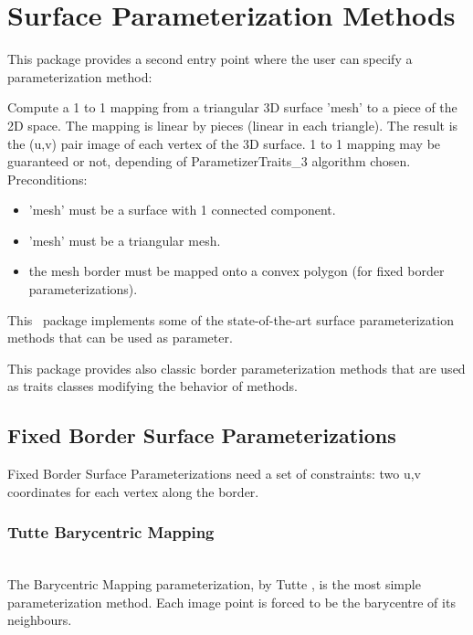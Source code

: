 \section{Surface Parameterization Methods}


This package provides a second  entry point
where the user can specify a parameterization method:

{
Compute a 1 to 1 mapping from a triangular 3D surface 'mesh' to a piece of the 2D space. The mapping is linear by pieces (linear in each triangle). The result is the (u,v) pair image of each vertex of the 3D surface.
1 to 1 mapping may be guaranteed or not, depending of ParametizerTraits\_3 algorithm chosen.
Preconditions:\begin{itemize}
\item 'mesh' must be a surface with 1 connected component.\item 'mesh' must be a triangular mesh.\item the mesh border must be mapped onto a convex polygon (for fixed border parameterizations).\end{itemize}
}


This \cgal\ package implements some of the state-of-the-art surface
parameterization methods that can be used as  parameter.

This package provides also classic border parameterization methods
that are used as traits classes modifying the behavior of
 methods.


\subsection{Fixed Border Surface Parameterizations}

Fixed Border Surface Parameterizations need a
set of constraints: two u,v coordinates for each vertex along the border.

\subsubsection{Tutte Barycentric Mapping}

  \\

The Barycentric Mapping parameterization, by Tutte \cite{cgal:fh-survey-05},
is the most simple parameterization method. Each image point is forced to be
the barycentre of its neighbours.

